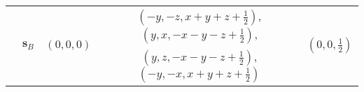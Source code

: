 \documentclass[reprint,preprintnumbers,amsmath,amssymb,aps,prl]{revtex4-1}
\begin{document}
\begin{table*}[h]
\begin{ruledtabular}
\begin{tabular}{clccc}
            \colrule
            \multirow{2}{*}{5} & \multirow{2}{*}{$\mathbf{s}_B$} & \multirow{2}{*}{$\left(0,0,0\right)$}                               & $(-y, -z, x+y+z+\frac{1}{2})$, $(y, x, -x-y-z+\frac{1}{2})$,                & \multirow{2}{*}{$\left(0,0,\frac{1}{2}\right)$}                     \\
                                            & &                                                                     & $(y, z, -x-y-z+\frac{1}{2})$, $(-y, -x, x+y+z+\frac{1}{2})$                 &                                                                     \\
        \end{tabular}
    \end{ruledtabular}
\end{table*}
\end{document}
